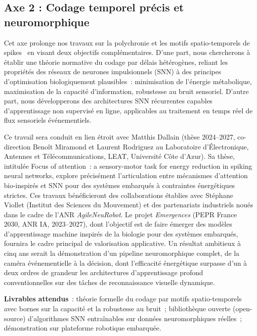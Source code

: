 \documentclass[10pt,french,a4paper]{article}%
\begin{document}
\subsection{Axe 2 : Codage temporel précis et neuromorphique}

Cet axe prolonge nos travaux sur la polychronie et les motifs spatio-temporels de spikes~\citep{Grimaldi22polychronies,Grimaldi23BC} en visant deux objectifs complémentaires. D'une part, nous chercherons à établir une théorie normative du codage par délais hétérogènes, reliant les propriétés des réseaux de neurones impulsionnels (SNN) à des principes d'optimisation biologiquement plausibles~: minimisation de l'énergie métabolique, maximisation de la capacité d'information, robustesse au bruit sensoriel. D'autre part, nous développerons des architectures SNN récurrentes capables d'apprentissage non supervisé en ligne, applicables au traitement en temps réel de flux sensoriels événementiels.

Ce travail sera conduit en lien étroit avec Matthis Dallain (thèse 2024--2027, co-direction Benoît Miramond et Laurent Rodriguez au  Laboratoire d'Électronique, Antennes et Télécommunications, LEAT, Université Côte d'Azur). Sa thèse, intitulée \og{}Focus of attention~: a sensory-motor task for energy reduction in spiking neural networks\fg{}, explore précisément l'articulation entre mécanismes d'attention bio-inspirés et SNN pour des systèmes embarqués à contraintes énergétiques strictes. Ces travaux bénéficieront des collaborations établies avec Stéphane Viollet (Institut des Sciences du Mouvement) et des partenariats industriels noués dans le cadre de l'ANR \textit{AgileNeuRobot}. Le projet \textit{Emergences} (PEPR France 2030, ANR IA, 2023--2027), dont l'objectif est de faire émerger des modèles d'apprentissage machine inspirés de la biologie pour des systèmes embarqués, fournira le cadre principal de valorisation applicative. Un résultat ambitieux à cinq ans serait la démonstration d'un pipeline neuromorphique complet, de la caméra événementielle à la décision, dont l'efficacité énergétique surpasse d'un à deux ordres de grandeur les architectures d'apprentissage profond conventionnelles sur des tâches de reconnaissance visuelle dynamique.

\textbf{Livrables attendus}~: théorie formelle du codage par motifs spatio-temporels avec bornes sur la capacité et la robustesse au bruit~; bibliothèque ouverte (open-source) d'algorithmes SNN entraînables sur données neuromorphiques réelles~; démonstration sur plateforme robotique embarquée.
\end{document}
